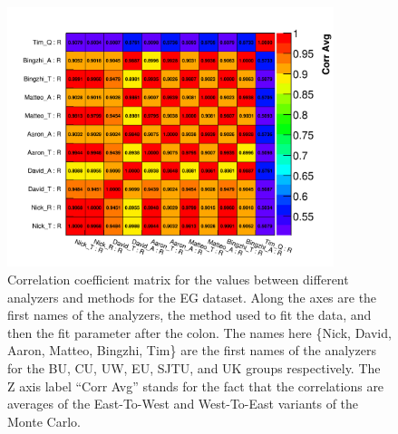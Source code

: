 \begin{figure}[h]
\centering
\includegraphics[width=0.85\textwidth]{Avg_CorrelationMatrix_R_R}
\caption{Correlation coefficient matrix for the \R values between different analyzers and methods for the EG dataset. Along the axes are the first names of the analyzers, the method used to fit the data, and then the fit parameter after the colon. The names here \{Nick, David, Aaron, Matteo, Bingzhi, Tim\} are the first names of the analyzers for the BU, CU, UW, EU, SJTU, and UK groups respectively. The Z axis label ``Corr Avg'' stands for the fact that the correlations are averages of the East-To-West and West-To-East variants of the Monte Carlo.}
\label{fig:corrMatAnalyzer}
\end{figure}

